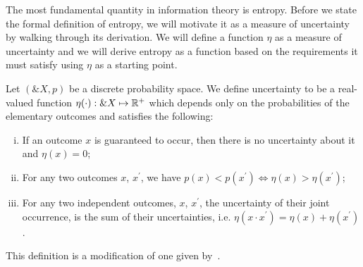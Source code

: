 The most fundamental quantity in information theory is entropy. Before
we state the formal definition of entropy, we will motivate it as a
measure of uncertainty by walking through its derivation. We will
define a function $\eta$ as a measure of uncertainty and we will
derive entropy as a function based on the requirements it must
satisfy using $\eta$ as a starting point.

\begin{definition}
  Let $(\&X, p)$ be a discrete probability space. We define
  \textnormal{\sffamily uncertainty} to be a real-valued function
  $\eta(\cdot): \&X \mapsto \mathbb{R}^+$ which depends only on the
  probabilities of the elementary outcomes and satisfies the
  following:
  \begin{enumerate}[(i)]
  \item If an outcome $x$ is guaranteed to occur, then there is no
    uncertainty about it and $\eta(x) = 0$;
  \item For any two outcomes $x$, $x^\prime$, we have $p(x) < p(x^\prime) \iff
    \eta(x) > \eta(x^\prime)$;
  \item For any two independent outcomes, $x$, $x^\prime$, the
    uncertainty of their joint occurrence, is the sum of their
    uncertainties, i.e.
    $\eta(x \cdot x^\prime) = \eta(x) + \eta(x^\prime)$.
  \end{enumerate}
\end{definition}
\begin{remark}
  This definition is a modification of one given
  by~\cite{ref:martin-2011}.
\end{remark}

